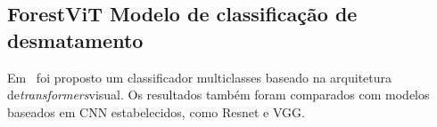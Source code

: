 \subsection{ForestViT Modelo de classificação de desmatamento}\label{sec:Cap2_ForestViT}

Em~\cite{9701667} foi proposto um classificador multiclasses baseado na arquitetura de\textit{transformers}visual. Os resultados também foram comparados com modelos baseados em CNN estabelecidos, como Resnet e VGG. 




